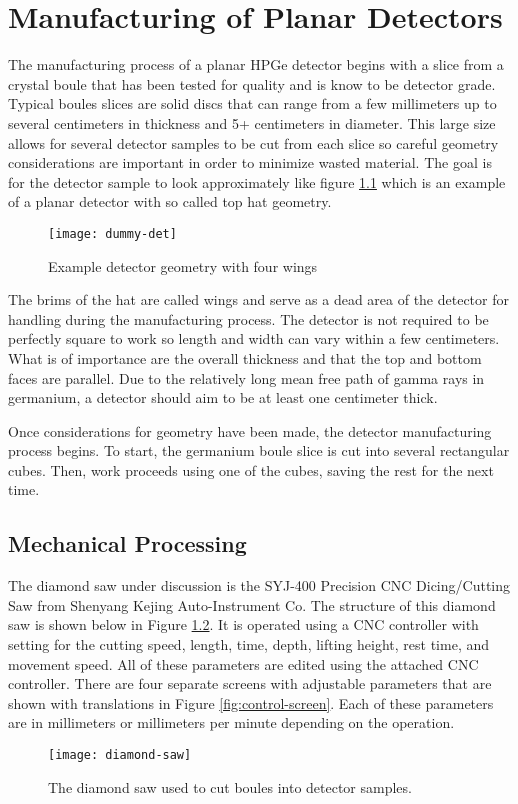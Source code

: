 \chapter{Manufacturing of Planar Detectors}
The manufacturing process of a planar HPGe detector begins with a slice from a crystal boule that has been tested for quality and is know to be detector grade.
Typical boules slices are solid discs that can range from a few millimeters up to several centimeters in thickness and 5+ centimeters in diameter.
This large size allows for several detector samples to be cut from each slice so careful geometry considerations are important in order to minimize wasted material.
The goal is for the detector sample to look approximately like figure \ref{fig:dummydet} which is an example of a planar detector with so called top hat geometry.
\begin{figure}[htpb]
\centering
\texttt{[image: dummy-det]}
\caption{Example detector geometry with four wings}
\label{fig:dummydet}
\end{figure}
The brims of the hat are called wings and serve as a dead area of the detector for handling during the manufacturing process.
The detector is not required to be perfectly square to work so length and width can vary within a few centimeters.
What is of importance are the overall thickness and that the top and bottom faces are parallel.
Due to the relatively long mean free path of gamma rays in germanium, a detector should aim to be at least one centimeter thick.

Once considerations for geometry have been made, the detector manufacturing process begins.
To start, the germanium boule slice is cut into several rectangular cubes.
Then, work proceeds using one of the cubes, saving the rest for the next time.%
\section{Mechanical Processing}
The diamond saw under discussion is the SYJ-400 Precision CNC Dicing/Cutting Saw from Shenyang Kejing Auto-Instrument Co.
The structure of this diamond saw is shown below in Figure \ref{fig:diamondsaw}.
It is operated using a CNC controller with setting for the cutting speed, length, time, depth, lifting height, rest time, and movement speed.
All of these parameters are edited using the attached CNC controller. 
There are four separate screens with adjustable parameters that are shown with translations in Figure \ref{fig:control-screen}. 
Each of these parameters are in millimeters or millimeters per minute depending on the operation.
\begin{figure}[htpb]
\centering
\texttt{[image: diamond-saw]}
\caption{The diamond saw used to cut boules into detector samples.}
\label{fig:diamondsaw}
\end{figure}

